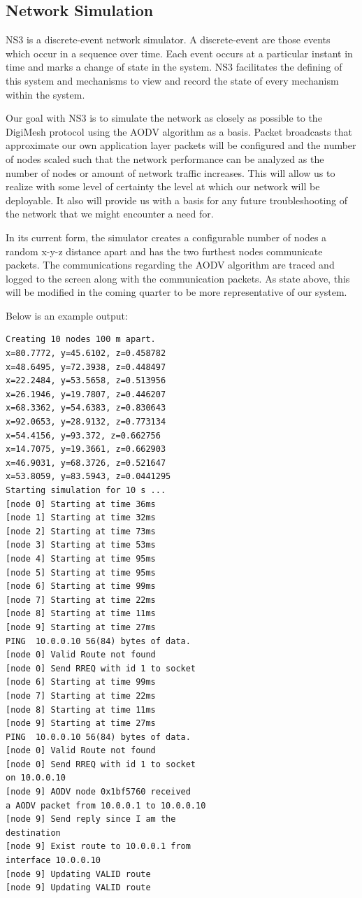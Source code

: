 \documentclass[journal,compsoc]{IEEEtran}
\begin{document}
\subsection{Network Simulation}

NS3 is a discrete-event network simulator. A discrete-event are those events which occur in a sequence over time. Each event occurs at a particular instant in time and marks a change of state in the system. NS3 facilitates the defining of this system and mechanisms to view and record the state of every mechanism within the system.

Our goal with NS3 is to simulate the network as closely as possible to the DigiMesh protocol using the AODV algorithm as a basis. Packet broadcasts that approximate our own application layer packets will be configured and the number of nodes scaled such that the network performance can be analyzed as the number of nodes or amount of network traffic increases. This will allow us to realize with some level of certainty the level at which our network will be deployable. It also will provide us with a basis for any future troubleshooting of the network that we might encounter a need for.

In its current form, the simulator creates a configurable number of nodes a random x-y-z distance apart and has the two furthest nodes communicate packets. The communications regarding the AODV algorithm are traced and logged to the screen along with the communication packets. As state above, this will be modified in the coming quarter to be more representative of our system.

Below is an example output:

\begin{lstlisting}
Creating 10 nodes 100 m apart.
x=80.7772, y=45.6102, z=0.458782
x=48.6495, y=72.3938, z=0.448497
x=22.2484, y=53.5658, z=0.513956
x=26.1946, y=19.7807, z=0.446207
x=68.3362, y=54.6383, z=0.830643
x=92.0653, y=28.9132, z=0.773134
x=54.4156, y=93.372, z=0.662756
x=14.7075, y=19.3661, z=0.662903
x=46.9031, y=68.3726, z=0.521647
x=53.8059, y=83.5943, z=0.0441295
Starting simulation for 10 s ...
[node 0] Starting at time 36ms
[node 1] Starting at time 32ms
[node 2] Starting at time 73ms
[node 3] Starting at time 53ms
[node 4] Starting at time 95ms
[node 5] Starting at time 95ms
[node 6] Starting at time 99ms
[node 7] Starting at time 22ms
[node 8] Starting at time 11ms
[node 9] Starting at time 27ms
PING  10.0.0.10 56(84) bytes of data.
[node 0] Valid Route not found
[node 0] Send RREQ with id 1 to socket
[node 6] Starting at time 99ms
[node 7] Starting at time 22ms
[node 8] Starting at time 11ms
[node 9] Starting at time 27ms
PING  10.0.0.10 56(84) bytes of data.
[node 0] Valid Route not found
[node 0] Send RREQ with id 1 to socket
on 10.0.0.10
[node 9] AODV node 0x1bf5760 received 
a AODV packet from 10.0.0.1 to 10.0.0.10
[node 9] Send reply since I am the 
destination
[node 9] Exist route to 10.0.0.1 from 
interface 10.0.0.10
[node 9] Updating VALID route
[node 9] Updating VALID route
\end{lstlisting}
\end{document}
